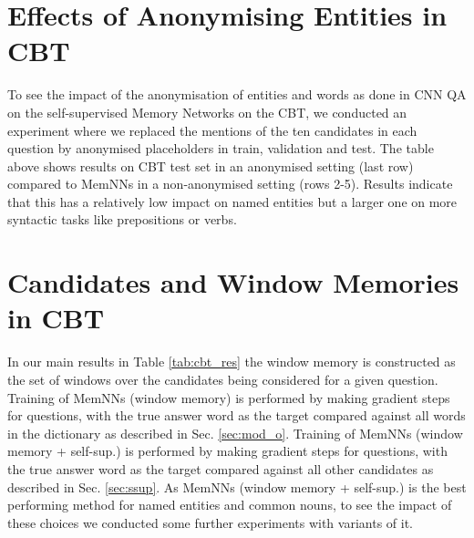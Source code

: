 \section{Effects of Anonymising Entities in CBT} \label{ap:anon}
%
  \begin{center}
    \vspace*{-4ex}
  \end{center}

  To see the impact of the anonymisation of entities and words as done
  in CNN QA on the self-supervised Memory Networks on the CBT, we
  conducted an experiment where we replaced the mentions of the ten
  candidates in each question by anonymised placeholders in train,
  validation and test. The table above shows results on CBT test set
  in an anonymised setting (last row) compared to MemNNs in a
  non-anonymised setting (rows 2-5).  Results indicate that this has a
  relatively low impact on named entities but a larger one on more
  syntactic tasks like prepositions or verbs.





\section{Candidates and Window Memories in CBT} \label{ap:nonsparse-windows}

In our main results in Table \ref{tab:cbt_res} the window memory is constructed as the set of windows
over the candidates being considered for a given question.
Training of {\sc MemNNs (window memory)} is performed by making gradient steps for questions, with 
the true answer word as the target compared against all words in the dictionary as described in Sec. \ref{sec:mod_o}.
Training of {\sc MemNNs  (window memory + self-sup.)} is performed by making gradient steps for questions, 
with the true answer word as the target compared against all other candidates as described in Sec. \ref{sec:ssup}.
As {\sc MemNNs  (window memory + self-sup.)} is the best performing method for named entities and common nouns, 
to see the impact of these choices we conducted some further experiments with variants of it.

